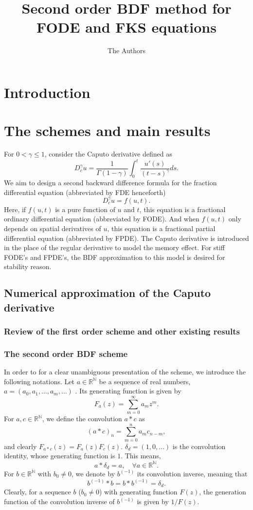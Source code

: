 \documentclass[11pt]{article} %
\title{Second order BDF method for FODE and FKS equations}
\author{The Authors}
\begin{document}
\maketitle

\section{Introduction}

\section{The schemes and main results}


For $0<\gamma\le 1$, consider the Caputo derivative defined as $$
D_c^{\gamma}u=\frac{1}{\Gamma(1-\gamma)}\int_0^t\frac{u'(s)}{(t-s)^{\gamma}}ds.
$$
We aim to design a second backward difference formula for the fraction differential equation (abbreviated by FDE henceforth)
\[
D_c^{\gamma}u =f(u,t).
\]  
Here, if $f(u,t)$ is a pure function of $u$ and $t$, this equation is a fractional ordinary differential equation (abbreviated by FODE). And when $f(u,t)$ only depends on spatial derivatives of $u$, this equation is a  fractional partial differential equation 
(abbreviated by FPDE). The Caputo derivative is introduced in the place of the regular derivative to model the memory effect. For stiff FODE's and FPDE's, the BDF approximation to this model is desired for stability reason. 


\subsection{Numerical approximation of the Caputo derivative}
\subsubsection{Review of the first order scheme and other existing results}

\subsubsection{The second order BDF scheme}

In order to for a clear unambiguous presentation of the scheme, we introduce the following notations.   Let $a\in \mathbb{R}^{\mathbb{N}}$ be a sequence of real numbers, $a=(a_0, a_1, \ldots, a_m, \ldots)$ .
Its generating function is given by $$
F_a(z)=\sum_{m=0}^{\infty}a_m z^m.
$$
For $a, c\in \mathbb{R}^{\mathbb{N}}$, we define the convolution $a*c$ as $$
(a*c)_n=\sum_{m=0}^{n}a_m c_{n-m},
$$
and clearly $F_{a*c}(z)=F_a(z)F_c(z)$. $\delta_d=(1,0,\ldots)$ is the convolution identity,  whose generating function is $1$. This means, 
\[
a * \delta_d =a, \quad \forall a \in \mathbb{R}^{\mathbb{N}}.
\] 
For $b\in \mathbb{R}^{\mathbb{N}}$ with $b_0\neq 0$, we denote by $b^{(-1)}$ its convolution inverse, meaning that
\[
b^{(-1)} * b = b *b^{(-1)} =\delta_d.
\]  
Clearly, for a sequence $b$ ($b_0\neq 0$) with generating function $F(z)$, the generation function of the convolution inverse of $b^{(-1)}$ is given by $1/F(z)$.
\end{document}
